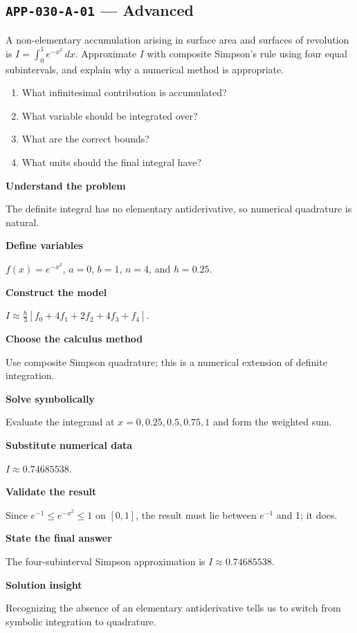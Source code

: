 \documentclass[11pt]{book}
\newcommand{\pid}[1]{\texttt{#1}}
\begin{document}
\subsection*{\pid{APP-030-A-01} — Advanced}
\begin{problembox}
A non-elementary accumulation arising in surface area and surfaces of revolution is $I=\int_0^1 e^{-x^2}\,dx$. Approximate $I$ with composite Simpson's rule using four equal subintervals, and explain why a numerical method is appropriate.
\end{problembox}
\begin{promptbox}\begin{enumerate}
\item What infinitesimal contribution is accumulated?
\item What variable should be integrated over?
\item What are the correct bounds?
\item What units should the final integral have?
\end{enumerate}\end{promptbox}
\begin{solutionbox}
\textbf{Understand the problem}\par The definite integral has no elementary antiderivative, so numerical quadrature is natural.\par\medskip
\textbf{Define variables}\par $f(x)=e^{-x^2}$, $a=0$, $b=1$, $n=4$, and $h=0.25$.\par\medskip
\textbf{Construct the model}\par $I\approx\frac{h}{3}[f_0+4f_1+2f_2+4f_3+f_4]$.\par\medskip
\textbf{Choose the calculus method}\par Use composite Simpson quadrature; this is a numerical extension of definite integration.\par\medskip
\textbf{Solve symbolically}\par Evaluate the integrand at $x=0,0.25,0.5,0.75,1$ and form the weighted sum.\par\medskip
\textbf{Substitute numerical data}\par $I\approx 0.74685538$.\par\medskip
\textbf{Validate the result}\par Since $e^{-1}\le e^{-x^2}\le1$ on $[0,1]$, the result must lie between $e^{-1}$ and 1; it does.\par\medskip
\textbf{State the final answer}\par The four-subinterval Simpson approximation is $I\approx 0.74685538$.\par\medskip
\textbf{Solution insight}\par Recognizing the absence of an elementary antiderivative tells us to switch from symbolic integration to quadrature.\par\medskip
\end{solutionbox}
\end{document}
